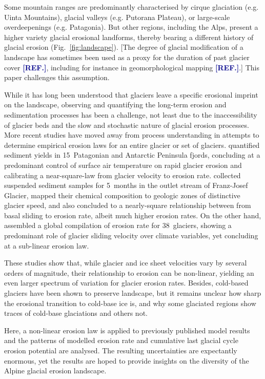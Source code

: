 \documentclass[utf8]{article}
\newcommand{\aref}[0]{\textcolor{darkblue}{\textbf{[REF.]}}}
\begin{document}
    Some mountain ranges are predominantly characterised by cirque glaciation
    (e.g. Uinta Mountains), glacial valleys (e.g. Putorana Plateau), or
    large-scale overdeepenings (e.g. Patagonia). But other regions, including
    the Alps, present a higher variety glacial erosional landforms, thereby
    bearing a different history of glacial erosion (Fig.~\ref{fig:landscape}).
    [The degree of glacial modification of a landscape has sometimes been used
    as a proxy for the duration of past glacier cover \aref, including for
    instance in geomorphological mapping \aref.] This paper challenges this
    assumption.

    While it has long been understood that glaciers leave a specific erosional
    imprint on the landscape, observing and quantifying the long-term erosion
    and sedimentation processes has been a challenge, not least due to the
    inaccessibility of glacier beds and the slow and stochastic nature of
    glacial erosion processes. More recent studies have moved away from process
    understanding in attempts to determine empirical erosion laws for an entire
    glacier or set of glaciers. \citet{Koppes.etal.2015} quantified sediment
    yields in 15~Patagonian and Antarctic Peninsula fjords, concluding at a
    predominant control of surface air temperature on rapid glacier erosion and
    calibrating a near-square-law from glacier velocity to erosion rate.
    \citet{Herman.etal.2015} collected suspended sediment samples for 5~months
    in the outlet stream of Franz-Josef Glacier, mapped their chemical
    composition to geologic zones of distinctive glacier speed, and also
    concluded to a nearly-square relationship between from basal sliding to
    erosion rate, albeit much higher erosion rates. On the other hand,
    \citet{Cook.etal.2020} assembled a global compilation of erosion rate for
    38~glaciers, showing a predominant role of glacier sliding velocity over
    climate variables, yet concluding at a sub-linear erosion law.

    These studies show that, while glacier and ice sheet velocities vary by
    several orders of magnitude, their relationship to erosion can be
    non-linear, yielding an even larger spectrum of variation for glacier
    erosion rates. Besides, cold-based glaciers have been shown to preserve
    landscape, but it remains unclear how sharp the erosional transition to
    cold-base ice is, and why some glaciated regions show traces of cold-base
    glaciations and others not.

    Here, a non-linear erosion law is applied to previously published model
    results and the patterns of modelled erosion rate and cumulative
    last glacial cycle erosion potential are analysed. The resulting
    uncertainties are expectantly enormous, yet the results are hoped to
    provide insights on the diversity of the Alpine glacial erosion landscape.
\end{document}
